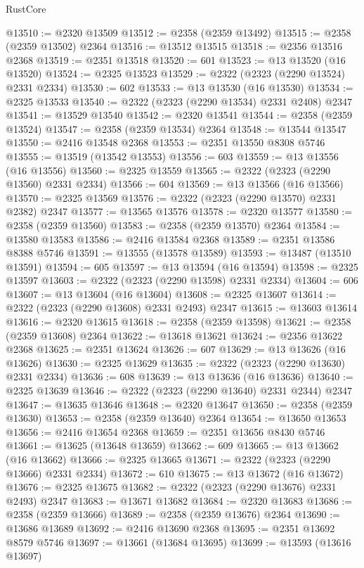 \begin{lexlean}{RustCore}
\begin{coremodule}
@13510 := @2320 @13509
@13512 := @2358 (@2359 @13492)
@13515 := @2358 (@2359 @13502) @2364
@13516 := @13512 @13515
@13518 := @2356 @13516 @2368
@13519 := @2351 @13518
@13520 := 601
@13523 := @13 @13520 (@16 @13520)
@13524 := @2325 @13523
@13529 := @2322 (@2323 (@2290 @13524) @2331 @2334)
@13530 := 602
@13533 := @13 @13530 (@16 @13530)
@13534 := @2325 @13533
@13540 := @2322 (@2323 (@2290 @13534) @2331 @2408) @2347
@13541 := @13529 @13540
@13542 := @2320 @13541
@13544 := @2358 (@2359 @13524)
@13547 := @2358 (@2359 @13534) @2364
@13548 := @13544 @13547
@13550 := @2416 @13548 @2368
@13553 := @2351 @13550 @8308 @5746
@13555 := @13519 (@13542 @13553)
@13556 := 603
@13559 := @13 @13556 (@16 @13556)
@13560 := @2325 @13559
@13565 := @2322 (@2323 (@2290 @13560) @2331 @2334)
@13566 := 604
@13569 := @13 @13566 (@16 @13566)
@13570 := @2325 @13569
@13576 := @2322 (@2323 (@2290 @13570) @2331 @2382) @2347
@13577 := @13565 @13576
@13578 := @2320 @13577
@13580 := @2358 (@2359 @13560)
@13583 := @2358 (@2359 @13570) @2364
@13584 := @13580 @13583
@13586 := @2416 @13584 @2368
@13589 := @2351 @13586 @8388 @5746
@13591 := @13555 (@13578 @13589)
@13593 := @13487 (@13510 @13591)
@13594 := 605
@13597 := @13 @13594 (@16 @13594)
@13598 := @2325 @13597
@13603 := @2322 (@2323 (@2290 @13598) @2331 @2334)
@13604 := 606
@13607 := @13 @13604 (@16 @13604)
@13608 := @2325 @13607
@13614 := @2322 (@2323 (@2290 @13608) @2331 @2493) @2347
@13615 := @13603 @13614
@13616 := @2320 @13615
@13618 := @2358 (@2359 @13598)
@13621 := @2358 (@2359 @13608) @2364
@13622 := @13618 @13621
@13624 := @2356 @13622 @2368
@13625 := @2351 @13624
@13626 := 607
@13629 := @13 @13626 (@16 @13626)
@13630 := @2325 @13629
@13635 := @2322 (@2323 (@2290 @13630) @2331 @2334)
@13636 := 608
@13639 := @13 @13636 (@16 @13636)
@13640 := @2325 @13639
@13646 := @2322 (@2323 (@2290 @13640) @2331 @2344) @2347
@13647 := @13635 @13646
@13648 := @2320 @13647
@13650 := @2358 (@2359 @13630)
@13653 := @2358 (@2359 @13640) @2364
@13654 := @13650 @13653
@13656 := @2416 @13654 @2368
@13659 := @2351 @13656 @8430 @5746
@13661 := @13625 (@13648 @13659)
@13662 := 609
@13665 := @13 @13662 (@16 @13662)
@13666 := @2325 @13665
@13671 := @2322 (@2323 (@2290 @13666) @2331 @2334)
@13672 := 610
@13675 := @13 @13672 (@16 @13672)
@13676 := @2325 @13675
@13682 := @2322 (@2323 (@2290 @13676) @2331 @2493) @2347
@13683 := @13671 @13682
@13684 := @2320 @13683
@13686 := @2358 (@2359 @13666)
@13689 := @2358 (@2359 @13676) @2364
@13690 := @13686 @13689
@13692 := @2416 @13690 @2368
@13695 := @2351 @13692 @8579 @5746
@13697 := @13661 (@13684 @13695)
@13699 := @13593 (@13616 @13697)

\end{coremodule}
\end{lexlean}
